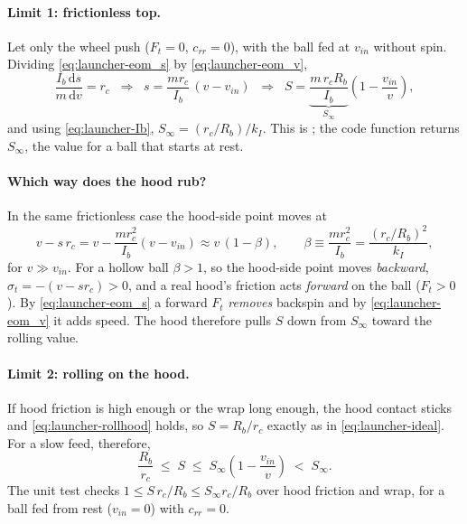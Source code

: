 \paragraph{Limit 1: frictionless top.} Let only the wheel push ($F_t = 0$, $c_{rr} = 0$), with the ball fed
at $v_{in}$ without spin. Dividing \eqref{eq:launcher-eom_s} by \eqref{eq:launcher-eom_v},
\begin{equation}
  \frac{I_b\,\mathrm{d}s}{m\,\mathrm{d}v} = r_c
  \;\;\Longrightarrow\;\;
  s = \frac{m r_c}{I_b}\,(v - v_{in})
  \;\;\Longrightarrow\;\;
  S = \underbrace{\frac{m\,r_c R_b}{I_b}}_{S_\infty}\left(1 - \frac{v_{in}}{v}\right),
  \label{eq:launcher-Sinf}
\end{equation}
and using \eqref{eq:launcher-Ib}, $S_\infty = (r_c/R_b)/k_I$. This is ; the code
function returns $S_\infty$, the value for a ball that starts at rest.

\paragraph{Which way does the hood rub?} In the same frictionless case the hood-side point moves at
\begin{equation}
  v - s\,r_c = v - \frac{m r_c^2}{I_b}(v - v_{in}) \approx v\,(1 - \beta), \qquad
  \beta \equiv \frac{m r_c^2}{I_b} = \frac{(r_c/R_b)^2}{k_I},
  \label{eq:launcher-beta}
\end{equation}
for $v \gg v_{in}$. For a hollow ball $\beta > 1$, so the hood-side point moves \emph{backward}, $\sigma_t =
-(v - s r_c) > 0$, and a real hood's friction acts \emph{forward} on the ball ($F_t > 0$). By
\eqref{eq:launcher-eom_s} a forward $F_t$ \emph{removes} backspin and by \eqref{eq:launcher-eom_v} it adds
speed. The hood therefore pulls $S$ down from $S_\infty$ toward the rolling value.

\paragraph{Limit 2: rolling on the hood.} If hood friction is high enough or the wrap long enough, the hood
contact sticks and \eqref{eq:launcher-rollhood} holds, so $S = R_b/r_c$ exactly as in
\eqref{eq:launcher-ideal}. For a slow feed, therefore,
\begin{equation}
  \frac{R_b}{r_c} \;\le\; S \;\le\; S_\infty\left(1 - \frac{v_{in}}{v}\right) \;<\; S_\infty .
  \label{eq:launcher-Sband}
\end{equation}
The unit test  checks $1 \le S\,r_c/R_b \le S_\infty r_c/R_b$ over hood friction
and wrap, for a ball fed from rest ($v_{in} = 0$) with $c_{rr} = 0$.

